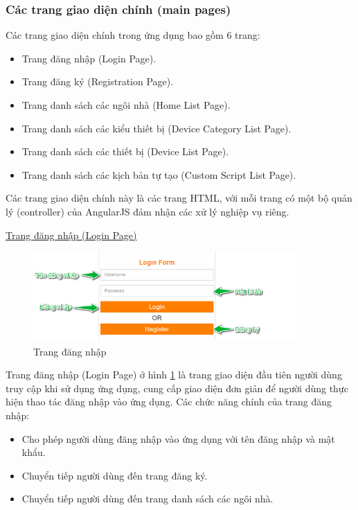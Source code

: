 \documentclass[12pt,a4paper,oneside]{extbook}
\begin{document}
\subsubsection{Các trang giao diện chính (main pages)}

\noindent
Các trang giao diện chính trong ứng dụng bao gồm 6 trang:

\begin{itemize}[topsep=1mm,itemsep=-0.5mm]
\item Trang đăng nhập (Login Page).
\item Trang đăng ký (Registration Page).
\item Trang danh sách các ngôi nhà (Home List Page).
\item Trang danh sách các kiểu thiết bị (Device Category List Page).
\item Trang danh sách các thiết bị (Device List Page).
\item Trang danh sách các kịch bản tự tạo (Custom Script List Page).
\vspace{1mm}
\end{itemize}

\noindent
Các trang giao diện chính này là các trang HTML, với mỗi trang có một bộ quản lý (controller) của AngularJS đảm nhận các xử lý nghiệp vụ riêng.

\noindent
\underline{Trang đăng nhập (Login Page)}

\begin{figure}[h]
  \centering
     \includegraphics[width=10cm]{6-LoginPage}
  \caption{Trang đăng nhập}\label{fig:6-LoginPage}
\end{figure}

\noindent
Trang đăng nhập (Login Page) ở hình \ref{fig:6-LoginPage} là trang giao diện đầu tiên người dùng truy cập khi sử dụng ứng dụng, cung cấp giao diện đơn giản để người dùng thực hiện thao tác đăng nhập vào ứng dụng. Các chức năng chính của trang đăng nhập:

\begin{itemize}[topsep=1mm,itemsep=-0.5mm]
\item Cho phép người dùng đăng nhập vào ứng dụng với tên đăng nhập và mật khẩu.
\item Chuyển tiếp người dùng đến trang đăng ký.
\item Chuyển tiếp người dùng đến trang danh sách các ngôi nhà.
\vspace{1mm}
\end{itemize}
\end{document}
